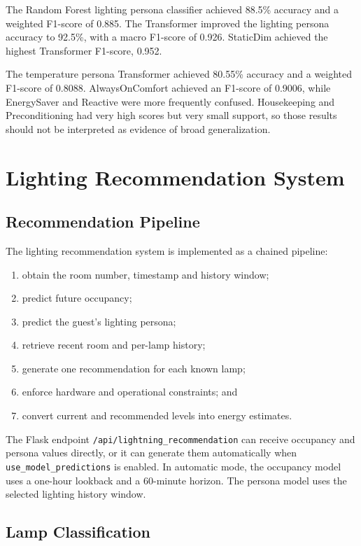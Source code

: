 The Random Forest lighting persona classifier achieved 88.5\% accuracy and a
weighted F1-score of 0.885. The Transformer improved the lighting persona
accuracy to 92.5\%, with a macro F1-score of 0.926. StaticDim achieved the
highest Transformer F1-score, 0.952.

The temperature persona Transformer achieved 80.55\% accuracy and a weighted
F1-score of 0.8088. AlwaysOnComfort achieved an F1-score of 0.9006, while
EnergySaver and Reactive were more frequently confused. Housekeeping and
Preconditioning had very high scores but very small support, so those results
should not be interpreted as evidence of broad generalization.


\chapter{Lighting Recommendation System}
\label{chap:lighting-recommendation}

\section{Recommendation Pipeline}

The lighting recommendation system is implemented as a chained pipeline:

\begin{enumerate}
    \item obtain the room number, timestamp and history window;
    \item predict future occupancy;
    \item predict the guest's lighting persona;
    \item retrieve recent room and per-lamp history;
    \item generate one recommendation for each known lamp;
    \item enforce hardware and operational constraints; and
    \item convert current and recommended levels into energy estimates.
\end{enumerate}

The Flask endpoint \texttt{/api/lightning\_recommendation} can receive
occupancy and persona values directly, or it can generate them automatically
when \texttt{use\_model\_predictions} is enabled. In automatic mode, the
occupancy model uses a one-hour lookback and a 60-minute horizon. The persona
model uses the selected lighting history window.

\section{Lamp Classification}

